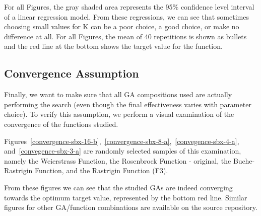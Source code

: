 For all Figures, the gray shaded area represents the 95\% confidence
level interval of a linear regression model. From these regressions,
we can see that sometimes choosing small values for K can be a poor
choice, a good choice, or make no difference at all. For all Figures,
the mean of 40 repetitions is shown as bullets and the red line at the
bottom shows the target value for the function.


\subsection{Convergence Assumption}

Finally, we want to make sure that all GA compositions used are actually
performing the search (even though the final effectiveness varies with
parameter choice). To verify this assumption, we perform a
visual examination of the convergence of the functions studied. 

Figures~\ref{convergence-sbx-16-b},~\ref{convergence-sbx-8-a},~\ref{convegence-sbx-4-a},
and~\ref{convegence-sbx-3-a} are randomly selected samples of this
examination, namely the Weierstrass Function, the Rosenbrock Function
- original, the Buche-Rastrigin Function, and the Rastrigin Function
(F3).

From these figures we can see that the studied GAs are indeed
converging towards the optimum target value, represented by the bottom
red line. Similar figures for other GA/function combinations are
available on the source repository.

